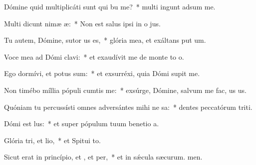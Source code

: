\item Dómine quid multiplicáti sunt qui bu me?~* multi ingunt adsum me.
\item Multi dicunt nimæ æ:~* Non est salus ipsi in o jus.
\item Tu autem, Dómine, sutor us es,~* glória mea, et exáltans put um.
\item Voce mea ad Dómi clavi:~* et exaudívit me de monte to o.
\item Ego dormívi, et potus sum:~* et exsurréxi, quia Dómi supit me.
\item Non timébo míllia pópuli cumtis me:~* exsúrge, Dómine, salvum me fac, us us.
\item Quóniam tu percussísti omnes adversántes mihi ne sa:~* dentes peccatórum triti.
\item Dómi est lus:~* et super pópulum tuum benetio a.
\item Glória tri, et lio,~* et Spitui to.
\item Sicut erat in princípio, et , et per,~* et in sǽcula sæcurum. men.
